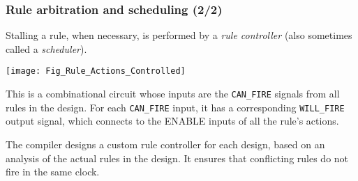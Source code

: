 \begin{frame}[fragile]
\frametitle{Rule arbitration and scheduling (2/2)}

\footnotesize

Stalling a rule, when necessary, is performed by a \emph{rule
controller} (also sometimes called a \emph{scheduler}).

\begin{center}
 \texttt{[image: Fig\_Rule\_Actions\_Controlled]}
\end{center}

This is a combinational circuit whose inputs are the {\tt CAN\_FIRE}
signals from all rules in the design.  For each {\tt CAN\_FIRE} input,
it has a corresponding {\tt WILL\_FIRE} output signal, which connects
to the ENABLE inputs of all the rule's actions.

\vspace{1ex}

The {\bsc} compiler designs a custom rule controller for each design,
based on an analysis of the actual rules in the design.  It ensures
that conflicting rules do not fire in the same clock.

\end{frame}


